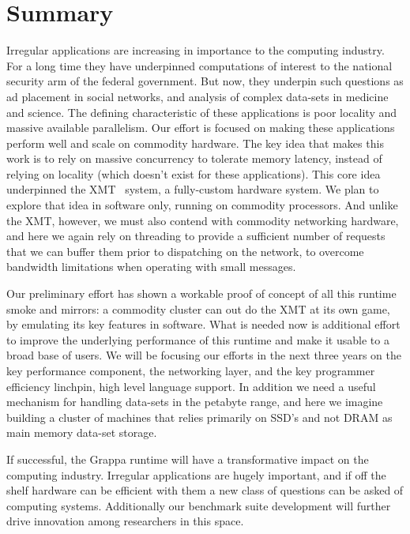 \section{Summary}

Irregular applications are increasing in importance to the computing industry.
For a long time they have underpinned computations of interest to the national
security arm of the federal government. But now, they underpin such questions
as ad placement in social networks, and analysis of complex data-sets in
medicine and science. The defining characteristic of these applications is
poor locality and massive available parallelism. Our effort is focused on
making these applications perform well and scale on commodity hardware. The
key idea that makes this work is to rely on massive concurrency to tolerate
memory latency, instead of relying on locality (which doesn't exist for these
applications). This core idea underpinned the XMT~\cite{feo:xmt} system, a
fully-custom hardware system. We plan to explore that idea in software only,
running on commodity processors. And unlike the XMT, however, we must also
contend with commodity networking hardware, and here we again rely on
threading to provide a sufficient number of requests that we can buffer them
prior to dispatching on the network, to overcome bandwidth limitations when
operating with small messages.

Our preliminary effort has shown a workable proof of concept of all this
runtime smoke and mirrors: a commodity cluster can out do the XMT at its own
game, by emulating its key features in software. What is needed now is
additional effort to improve the underlying performance of this runtime and
make it usable to a broad base of users. We will be focusing our efforts
in the next three years on the key performance component, the networking
layer, and the key programmer efficiency linchpin, high level language
support. In addition we need a useful mechanism for handling data-sets in the
petabyte range, and here we imagine building a cluster of machines that relies
primarily on SSD's and not DRAM as main memory data-set storage.

If successful, the Grappa runtime will have a transformative impact on the
computing industry. Irregular applications are hugely important, and if off
the shelf hardware can be efficient with them a new class of questions can be
asked of computing systems. Additionally our benchmark suite development will
further drive innovation among researchers in this space.


